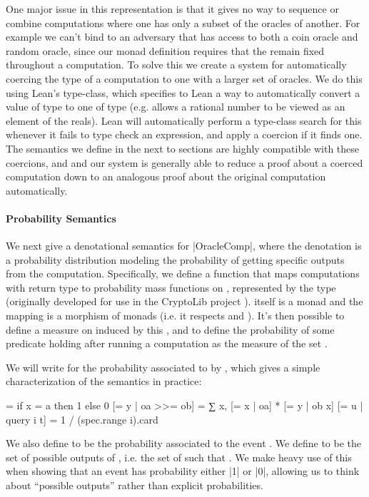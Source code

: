 One major issue in this representation is that it gives no way to sequence or combine computations where one has only a subset of the oracles of another.
For example we can't bind  to an adversary that has access to both a coin oracle and random oracle, since our monad definition requires that the  remain fixed throughout a computation.
To solve this we create a system for automatically coercing the type of a computation to one with a larger set of oracles.
We do this using Lean's  type-class, which specifies to Lean a way to automatically convert a value of type  to one of type  (e.g.  allows a rational number to be viewed as an element of the reals).
Lean will automatically perform a type-class search for this whenever it fails to type check an expression, and apply a coercion if it finds one.  
The semantics we define in the next to sections are highly compatible with these coercions, and and our system is generally able to reduce a proof about a coerced computation down to an analogous proof about the original computation automatically.

\paragraph{Probability Semantics} \label{DistSemantics}
We next give a denotational semantics for \lean|OracleComp|, where the denotation is a probability distribution modeling the probability of getting specific outputs from the computation.  Specifically, we define a function  that maps computations with return type  to probability mass functions on , represented by the type  (originally developed for use in the CryptoLib project \cite{CryptoLib}).
 itself is a monad and the mapping is a morphism of monads (i.e. it respects  and ).
It's then possible to define a measure on  induced by this , and to define the probability of some predicate  holding after running a computation as the measure of the set .

We will write \lean{[= x | oa]} for the probability associated to  by , which gives a simple characterization of the semantics in practice:
\begin{leancode}
[= x | return a] = if x = a then 1 else 0
[= y | oa >>= ob] = ∑ x, [= x | oa] * [= y | ob x]
[= u | query i t] = 1 / (spec.range i).card
\end{leancode}
We also define \lean{[p | oa]} to be the probability associated to the event .
We define  to be the set of possible outputs of , i.e. the set of  such that .
We make heavy use of this when showing that an event has probability either \lean|1| or \lean|0|, allowing us to think about ``possible outputs'' rather than explicit probabilities.

